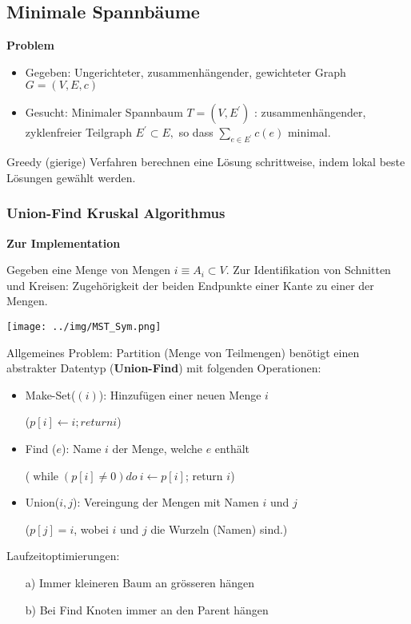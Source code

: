\documentclass[german]{latex4ei/latex4ei_sheet}
\begin{document}
\begin{sectionbox}
\subsection{Minimale Spannbäume}\smallskip
\textbf{Problem}\par
\begin{itemize}
    \item Gegeben: Ungerichteter, zusammenhängender, gewichteter Graph $G=(V, E, c)$
    \item Gesucht: Minimaler Spannbaum $T=\left(V, E^{\prime}\right)$ : zusammenhängender, zyklenfreier Teilgraph $E^{\prime} \subset E,$ so dass $\sum_{e \in E^{\prime}} c(e)$ minimal.
\end{itemize}
Greedy (gierige) Verfahren berechnen eine Lösung schrittweise, indem lokal beste Lösungen gewählt werden.\par\vspace{10px}

\subsubsection{Union-Find Kruskal Algorithmus}\smallskip
\textbf{Zur Implementation}\par
Gegeben eine Menge von Mengen $i \equiv A_{i} \subset V$. Zur Identifikation von Schnitten und Kreisen: Zugehörigkeit der beiden Endpunkte einer Kante zu einer der Mengen.\par
\begin{center}
    \texttt{[image: ../img/MST\_Sym.png]}\par
\end{center}\smallskip

Allgemeines Problem: Partition (Menge von Teilmengen) benötigt einen abstrakter Datentyp (\textbf{Union-Find}) mit folgenden Operationen:\par
\begin{itemize}
    \item Make-Set($(i)$): Hinzufügen einer neuen Menge $i$\par($p[i] \leftarrow i; return i$)
    \item Find ($e$): Name $i$ der Menge, welche $e$ enthält \par($\operatorname{while} (p[i]\neq 0) do\ i \leftarrow p[i]$; return $i$)
    \item Union($i,j$): Vereingung der Mengen mit Namen $i$ und $j$ \par($p[j]=i$, wobei $i$ und $j$ die Wurzeln (Namen) sind.)
\end{itemize}\smallskip
Laufzeitoptimierungen:\par
\begin{itemize}
    \item[a)] Immer kleineren Baum an grösseren hängen
    \item[b)] Bei Find Knoten immer an den Parent hängen
\end{itemize}\par\smallskip


\end{sectionbox}
\end{document}
